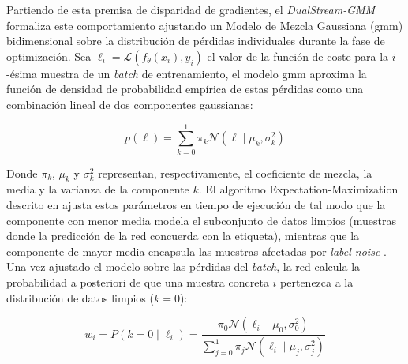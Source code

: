 
Partiendo de esta premisa de disparidad de gradientes, el \textit{DualStream-GMM} formaliza este comportamiento ajustando un Modelo de Mezcla Gaussiana (\gls{gmm}) bidimensional sobre la distribución de pérdidas individuales durante la fase de optimización. Sea $\ell_i = \mathcal{L}(f_\theta(x_i), y_i)$ el valor de la función de coste para la $i$-ésima muestra de un \textit{batch} de entrenamiento, el modelo \gls{gmm} aproxima la función de densidad de probabilidad empírica de estas pérdidas como una combinación lineal de dos componentes gaussianas:

\begin{equation}
    p(\ell) = \sum_{k=0}^{1} \pi_k \mathcal{N}(\ell \mid \mu_k, \sigma_k^2)
\end{equation}

Donde $\pi_k$, $\mu_k$ y $\sigma_k^2$ representan, respectivamente, el coeficiente de mezcla, la media y la varianza de la componente $k$. El algoritmo Expectation-Maximization descrito en \cite{li_dividemix_2020} ajusta estos parámetros en tiempo de ejecución de tal modo que la componente con menor media modela el subconjunto de datos limpios (muestras donde la predicción de la red concuerda con la etiqueta), mientras que la componente de mayor media encapsula las muestras afectadas por \textit{label noise} \cite{najar_comparison_2017}. 
Una vez ajustado el modelo sobre las pérdidas del \textit{batch}, la red calcula la probabilidad a posteriori de que una muestra concreta $i$ pertenezca a la distribución de datos limpios ($k=0$):

\begin{equation}
    w_i = P(k=0 \mid \ell_i) = \frac{\pi_0 \mathcal{N}(\ell_i \mid \mu_0, \sigma_0^2)}{\sum_{j=0}^{1} \pi_j \mathcal{N}(\ell_i \mid \mu_j, \sigma_j^2)}
\end{equation}

